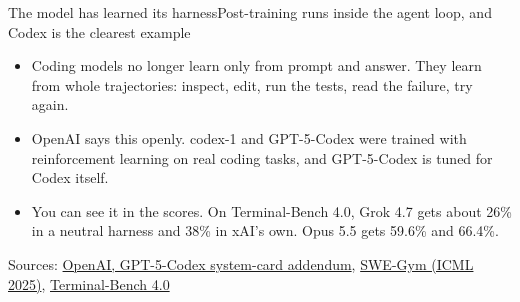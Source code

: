 \documentclass[aspectratio=169]{beamer}
\newcommand{\srcmulti}[1]{\par\vfill{\fontsize{7}{8}\selectfont\color{ACINgray}Sources: #1}}
\begin{document}
\begin{frame}{The model has learned its harness}{Post-training runs inside the agent loop, and Codex is the clearest example}
\small
\begin{center}
\end{center}
\vspace{1mm}
\begin{itemize}\itemsep5pt
  \item Coding models no longer learn only from prompt and answer. They learn from whole trajectories: inspect, edit, run the tests, read the failure, try again.
  \item OpenAI says this openly. codex-1 and GPT-5-Codex were trained with reinforcement learning on real coding tasks, and GPT-5-Codex is tuned for Codex itself.
  \item You can see it in the scores. On Terminal-Bench 4.0, Grok 4.7 gets about 26\% in a neutral harness and 38\% in xAI's own. Opus 5.5 gets 59.6\% and 66.4\%.
\end{itemize}
\srcmulti{\href{https://openai.com/index/gpt-5-system-card-addendum-gpt-5-codex/}{OpenAI, GPT-5-Codex system-card addendum}, \href{https://proceedings.mlr.press/v267/pan25g.html}{SWE-Gym (ICML 2025)}, \href{https://artificialanalysis.ai/evaluations/terminalbench-4-0}{Terminal-Bench 4.0}}
\end{frame}
\end{document}
